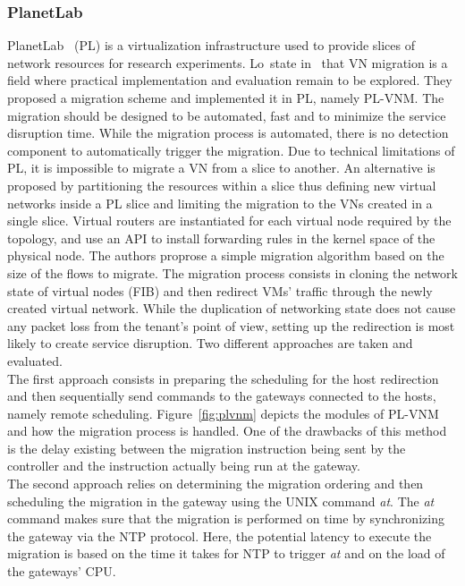 \subsubsection{PlanetLab}
PlanetLab~\cite{Chun2003d} (PL) is a virtualization infrastructure used to provide slices of network resources for research experiments. Lo~\etal state in~\cite{Lo2014} that VN migration is a field where practical implementation and evaluation remain to be explored. They proposed a migration scheme and implemented it in PL, namely PL-VNM. The migration should be designed to be automated, fast and to minimize the service disruption time. While the migration process is automated, there is no detection component to automatically trigger the migration. Due to technical limitations of PL, it is impossible to migrate a VN from a slice to another. An alternative is proposed by partitioning the resources within a slice thus defining new virtual networks inside a PL slice and limiting the migration to the VNs created in a single slice. Virtual routers are instantiated for each virtual node required by the topology, and use an API to install forwarding rules in the kernel space of the physical node.
The authors proprose a simple migration algorithm based on the size of the flows to migrate.
The migration process consists in cloning the network state of virtual nodes (\ie FIB) and then  redirect VMs' traffic through the newly created virtual network.
While the duplication of networking state does not cause any packet loss from the tenant's point of view, setting up the redirection is most likely to create service disruption.
Two different approaches are taken and evaluated.\\
The first approach consists in preparing the scheduling for the host redirection and then sequentially send commands to the gateways connected to the hosts, namely remote scheduling.
Figure~\ref{fig:plvnm} depicts the modules of PL-VNM and how the migration process is handled.
One of the drawbacks of this method is the delay existing between the migration instruction being sent by the controller and the instruction actually being run at the gateway.\\
The second approach relies on determining the migration ordering and then scheduling the migration in the gateway using the UNIX command \textit{at}. The \textit{at} command makes sure that the migration is performed on time by synchronizing the gateway via the NTP protocol. Here, the potential latency to execute the migration is based on the time it takes for NTP to trigger \textit{at} and on the load of the gateways' CPU.

